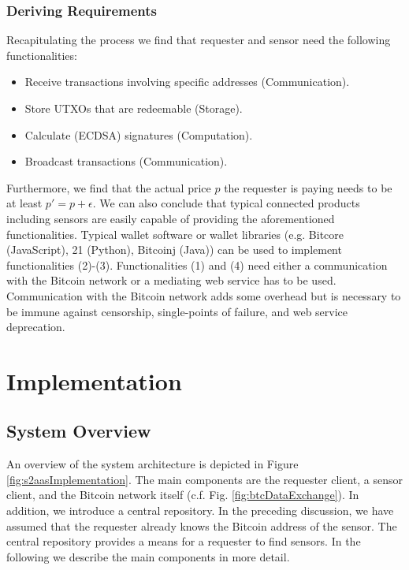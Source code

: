 \subsubsection{Deriving Requirements}
\label{sec:s2aas_requirements}

Recapitulating the process we find that requester and sensor need the following functionalities:
\begin{itemize}
\item Receive transactions involving specific addresses (Communication).
\item Store UTXOs that are redeemable (Storage).
\item Calculate (\ac{ECDSA}) signatures (Computation).
\item Broadcast transactions (Communication).
\end{itemize}
Furthermore, we find that the actual price $p$ the requester is paying needs to be at least $p'=p+\epsilon$.  
We can also conclude that typical connected products including sensors are easily capable of providing the aforementioned functionalities. Typical wallet software or wallet libraries (e.g. Bitcore (JavaScript), 21 (Python), Bitcoinj (Java)) can be used to implement functionalities (2)-(3). Functionalities (1) and (4) need either a communication with the Bitcoin network or a mediating web service has to be used. Communication with the Bitcoin network adds some overhead but is necessary to be immune against censorship, single-points of failure, and web service deprecation.

\section{Implementation}
\label{sec:s2aas_implementation}

\subsection{System Overview}

An overview of the system architecture is depicted in Figure \ref{fig:s2aasImplementation}. The main components are the requester client, a sensor client, and the Bitcoin network itself (c.f. Fig. \ref{fig:btcDataExchange}). In addition, we introduce a central repository. In the preceding discussion, we have assumed that the requester already knows the Bitcoin address of the sensor. The central repository provides a means for a requester to find sensors. In the following we describe the main components in more detail. 


